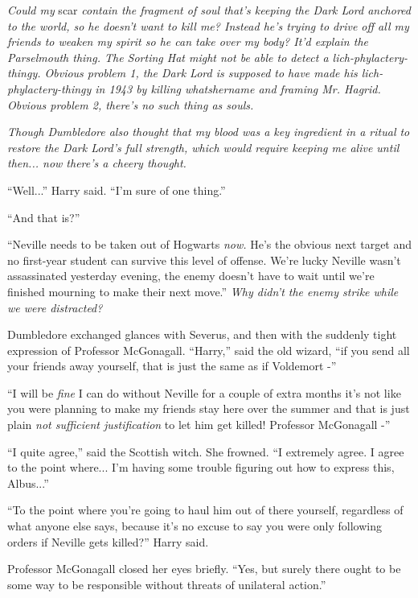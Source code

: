 \emph{Could my} scar \emph{contain the fragment of soul that's keeping
the Dark Lord anchored to the world, so he doesn't want to kill me?
Instead he's trying to drive off all my friends to weaken my spirit so
he can take over my body? It'd explain the Parselmouth thing. The
Sorting Hat might not be able to detect a lich-phylactery-thingy.
Obvious problem 1, the Dark Lord is supposed to have made his
lich-phylactery-thingy in 1943 by killing whatshername and framing Mr.
Hagrid. Obvious problem 2, there's no such thing as souls.}

\emph{Though Dumbledore also thought that my blood was a key ingredient
in a ritual to restore the Dark Lord's full strength, which would
require keeping me alive until then... now there's a cheery
thought.}

``Well...'' Harry said. ``I'm sure of one thing.''

``And that is?''

``Neville needs to be taken out of Hogwarts \emph{now.} He's the obvious
next target and no first-year student can survive this level of offense.
We're lucky Neville wasn't assassinated yesterday evening, the enemy
doesn't have to wait until we're finished mourning to make their next
move.'' \emph{Why didn't the enemy strike while we were distracted?}

Dumbledore exchanged glances with Severus, and then with the suddenly
tight expression of Professor McGonagall. ``Harry,'' said the old
wizard, ``if you send all your friends away yourself, that is just the
same as if Voldemort -''

``I will be \emph{fine} I can do without Neville for a couple of extra
months it's not like you were planning to make my friends stay here over
the summer and that is just plain \emph{not sufficient justification} to
let him get killed! Professor McGonagall -''

``I quite agree,'' said the Scottish witch. She frowned. ``I extremely
agree. I agree to the point where... I'm having some trouble
figuring out how to express this, Albus...''

``To the point where you're going to haul him out of there yourself,
regardless of what anyone else says, because it's no excuse to say you
were only following orders if Neville gets killed?'' Harry said.

Professor McGonagall closed her eyes briefly. ``Yes, but surely there
ought to be some way to be responsible without threats of unilateral
action.''

